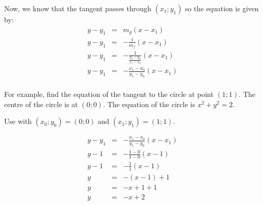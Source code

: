 Now, we know that the tangent passes through $(x_1;y_1)$ so the equation is given by:
\begin{eqnarray*}
y-y_1&=&m_{g}(x-x_1)\\
y-y_1&=&-\frac{1}{m_f}(x-x_1)\\
y-y_1&=&-\frac{1}{\frac{y_1-y_0}{x_1-x_0}}(x-x_1)\\
y-y_1&=&-\frac{x_1-x_0}{y_1-y_0}(x-x_1)\\
\end{eqnarray*}

For example, find the equation of the tangent to the circle at point $(1;1)$. The centre of the circle is at $(0;0)$. The equation of the circle is $x^2+y^2=2$.

Use  with $(x_0;y_0)=(0;0)$ and $(x_1;y_1)=(1;1)$.

\begin{eqnarray*}
y-y_1&=&-\frac{x_1-x_0}{y_1-y_0}(x-x_1)\\
y-1&=&-\frac{1-0}{1-0}(x-1)\\
y-1&=&-\frac{1}{1}(x-1)\\
y&=&-(x-1)+1\\
y&=&-x+1+1\\
y&=&-x+2
\end{eqnarray*}

